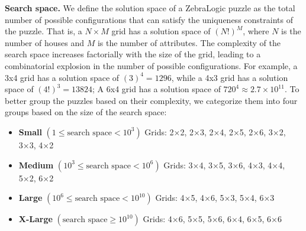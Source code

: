 \textbf{Search space.} 
We define the solution space of a ZebraLogic puzzle as the total number of possible configurations that can satisfy the uniqueness constraints of the puzzle. That is, a $N \times M$ grid has a solution space of $(N!)^M$, where $N$ is the number of houses and $M$ is the number of attributes. The complexity of the search space increases factorially with the size of the grid, leading to a combinatorial explosion in the number of possible configurations.
For example, a 3x4 grid has a solution space of $(3)^4 = 1296$, while a 4x3 grid has a solution space of $(4!)^3 = 13824$; A 6x4 grid has a solution space of $720^4 \approx 2.7 \times 10^{11}$.
To better group the puzzles based on their complexity, we categorize them into four groups based on the size of the search space:
\vspace{-0.2cm}
\begin{itemize}[leftmargin=0.9cm]
    \small
    \item \textbf{Small}     \hspace{1.5em} $(1 \leq \text{search space} < 10^3)$  \hspace{2.3em} \small{Grids: 2×2, 2×3, 2×4, 2×5, 2×6, 3×2, 3×3, 4×2}
    \item \textbf{Medium}    \hspace{0.3em} $(10^3 \leq \text{search space} < 10^6)$               \hspace{1.3em} \small{Grids: 3×4, 3×5, 3×6, 4×3, 4×4, 5×2, 6×2}
    \item \textbf{Large}     \hspace{1.5em} $(10^6 \leq \text{search space} < 10^{10})$            \hspace{1.0em} \small{Grids: 4×5, 4×6, 5×3, 5×4, 6×3}
    \item \textbf{X-Large}   \hspace{0.5em} $(\text{search space} \geq 10^{10})$                   \hspace{3.3em} \small{Grids: 4×6, 5×5, 5×6, 6×4, 6×5, 6×6}
\end{itemize}
\vspace{-0.2cm}


